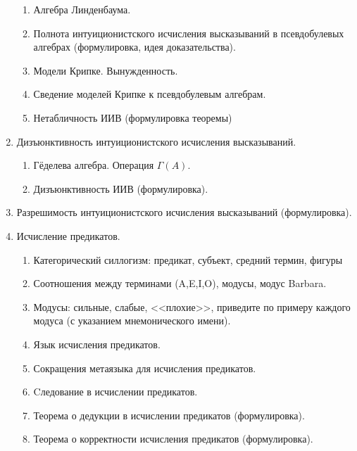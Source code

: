 \documentclass[11pt,a4paper,oneside]{scrartcl}
\begin{document}
\begin{enumerate}
\begin{enumerate}
\item Алгебра Линденбаума. 
\item Полнота интуиционистского исчисления высказываний в псевдобулевых алгебрах (формулировка, идея доказательства).
\item Модели Крипке. Вынужденность.
\item Сведение моделей Крипке к псевдобулевым алгебрам. 
\item Нетабличность ИИВ (формулировка теоремы)
\end{enumerate}
\item Дизъюнктивность интуиционистского исчисления высказываний.
\begin{enumerate}
\item Гёделева алгебра. Операция $\Gamma(A)$.
\item Дизъюнктивность ИИВ (формулировка).
\end{enumerate}
\item Разрешимость интуиционистского исчисления высказываний (формулировка).
\item Исчисление предикатов.
\begin{enumerate}
\item Категорический силлогизм: предикат, субъект, средний термин, фигуры
\item Соотношения между терминами (A,E,I,O), модусы, модус Barbara.
\item Модусы: сильные, слабые, <<плохие>>, приведите по примеру каждого модуса (с указанием мнемонического имени).
\item Язык исчисления предикатов.
\item Сокращения метаязыка для исчисления предикатов.
\item Cледование в исчислении предикатов.
\item Теорема о дедукции в исчислении предикатов (формулировка).
\item Теорема о корректности исчисления предикатов (формулировка).
\end{enumerate}

\end{enumerate}
\end{document}
